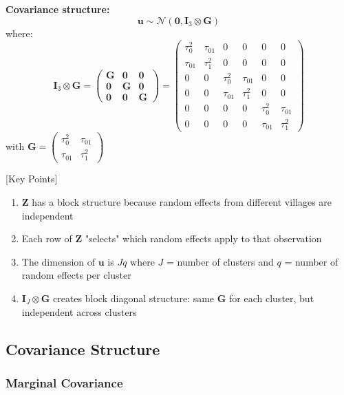 \documentclass{article}
\begin{document}
\textbf{Covariance structure:}
\begin{equation}
\mathbf{u} \sim \mathcal{N}(\mathbf{0}, \mathbf{I}_3 \otimes \mathbf{G})
\end{equation}
where:
\begin{equation}
\mathbf{I}_3 \otimes \mathbf{G} = \begin{pmatrix}
\mathbf{G} & \mathbf{0} & \mathbf{0} \\
\mathbf{0} & \mathbf{G} & \mathbf{0} \\
\mathbf{0} & \mathbf{0} & \mathbf{G}
\end{pmatrix}
= \begin{pmatrix}
\tau_0^2 & \tau_{01} & 0 & 0 & 0 & 0 \\
\tau_{01} & \tau_1^2 & 0 & 0 & 0 & 0 \\
0 & 0 & \tau_0^2 & \tau_{01} & 0 & 0 \\
0 & 0 & \tau_{01} & \tau_1^2 & 0 & 0 \\
0 & 0 & 0 & 0 & \tau_0^2 & \tau_{01} \\
0 & 0 & 0 & 0 & \tau_{01} & \tau_1^2
\end{pmatrix}
\end{equation}
with $\mathbf{G} = \begin{pmatrix} \tau_0^2 & \tau_{01} \\ \tau_{01} & \tau_1^2 \end{pmatrix}$


[Key Points]
\begin{enumerate}
    \item $\mathbf{Z}$ has a block structure because random effects from different villages are independent
    \item Each row of $\mathbf{Z}$ "selects" which random effects apply to that observation
    \item The dimension of $\mathbf{u}$ is $Jq$ where $J$ = number of clusters and $q$ = number of random effects per cluster
    \item $\mathbf{I}_J \otimes \mathbf{G}$ creates block diagonal structure: same $\mathbf{G}$ for each cluster, but independent across clusters
\end{enumerate}


\subsection{Covariance Structure}

\subsubsection{Marginal Covariance}
\end{document}
